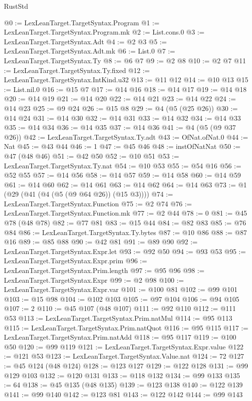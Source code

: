 \begin{lexlean}{RustStd}
\begin{coremodule}
{\begin{coremodule}
{{{{{{{{{{{{{{{{{{{{{{{{{{{{{{{{{@0 := LexLeanTarget.TargetSyntax.Program
@1 := LexLeanTarget.TargetSyntax.Program.mk
@2 := List.cons.{0}
@3 := LexLeanTarget.TargetSyntax.Adt
@4 := @2 @3
@5 := LexLeanTarget.TargetSyntax.Adt.mk
@6 := List.{0}
@7 := LexLeanTarget.TargetSyntax.Ty
@8 := @6 @7
@9 := @2 @8
@10 := @2 @7
@11 := LexLeanTarget.TargetSyntax.Ty.fixed
@12 := LexLeanTarget.TargetSyntax.IntKind.u32
@13 := @11 @12
@14 := @10 @13
@15 := List.nil.{0}
@16 := @15 @7
@17 := @14 @16
@18 := @14 @17
@19 := @14 @18
@20 := @14 @19
@21 := @14 @20
@22 := @14 @21
@23 := @14 @22
@24 := @14 @23
@25 := @9 @24
@26 := @15 @8
@29 := @4 (@5 (@25 @26))
@30 := @14 @24
@31 := @14 @30
@32 := @14 @31
@33 := @14 @32
@34 := @14 @33
@35 := @14 @34
@36 := @14 @35
@37 := @14 @36
@41 := @4 (@5 (@9 @37 @26))
@42 := LexLeanTarget.TargetSyntax.Ty.adt
@43 := OfNat.ofNat.{0}
@44 := Nat
@45 := @43 @44
@46 := 1
@47 := @45 @46
@48 := instOfNatNat
@50 := @47 (@48 @46)
@51 := @42 @50
@52 := @10 @51
@53 := LexLeanTarget.TargetSyntax.Ty.nat
@54 := @10 @53
@55 := @54 @16
@56 := @52 @55
@57 := @14 @56
@58 := @14 @57
@59 := @14 @58
@60 := @14 @59
@61 := @14 @60
@62 := @14 @61
@63 := @14 @62
@64 := @14 @63
@73 := @1 (@29 (@41 (@4 (@5 (@9 @64 @26)) (@15 @3))))
@74 := LexLeanTarget.TargetSyntax.Function
@75 := @2 @74
@76 := LexLeanTarget.TargetSyntax.Function.mk
@77 := @2 @44
@78 := 0
@81 := @45 @78 (@48 @78)
@82 := @77 @81
@83 := @15 @44
@84 := @82 @83
@85 := @76 @84
@86 := LexLeanTarget.TargetSyntax.Ty.bytes
@87 := @10 @86
@88 := @87 @16
@89 := @85 @88
@90 := @42 @81
@91 := @89 @90
@92 := LexLeanTarget.TargetSyntax.Expr.let
@93 := @92 @50
@94 := @93 @53
@95 := LexLeanTarget.TargetSyntax.Expr.prim
@96 := LexLeanTarget.TargetSyntax.Prim.length
@97 := @95 @96
@98 := LexLeanTarget.TargetSyntax.Expr
@99 := @2 @98
@100 := LexLeanTarget.TargetSyntax.Expr.var
@101 := @100 @81
@102 := @99 @101
@103 := @15 @98
@104 := @102 @103
@105 := @97 @104
@106 := @94 @105
@107 := 2
@110 := @45 @107 (@48 @107)
@111 := @92 @110
@112 := @111 @53
@113 := LexLeanTarget.TargetSyntax.Prim.natMul
@114 := @95 @113
@115 := LexLeanTarget.TargetSyntax.Prim.natQuot
@116 := @95 @115
@117 := LexLeanTarget.TargetSyntax.Prim.natAdd
@118 := @95 @117
@119 := @100 @50
@120 := @99 @119
@121 := LexLeanTarget.TargetSyntax.Expr.value
@122 := @121 @53
@123 := LexLeanTarget.TargetSyntax.Value.nat
@124 := 72
@127 := @45 @124 (@48 @124)
@128 := @123 @127
@129 := @122 @128
@131 := @99 @129 @103
@132 := @120 @131
@133 := @118 @132
@134 := @99 @133
@135 := 64
@138 := @45 @135 (@48 @135)
@139 := @123 @138
@140 := @122 @139
@141 := @99 @140
@142 := @123 @81
@143 := @122 @142
@144 := @99 @143
}}}}}}}}}}}}}}}}}}}}}}}}}}}}}}}}}
\end{coremodule}}
\end{coremodule}
\end{lexlean}
